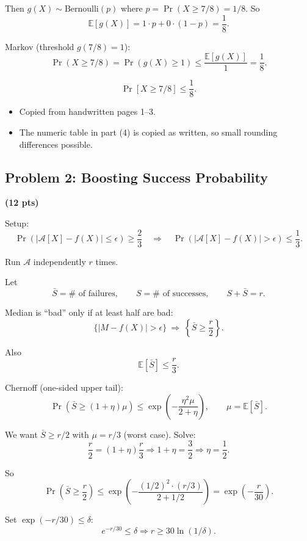 \documentclass[10pt]{article}
\newcommand{\spara}[1]{\vspace{.5em}\noindent {\large\sffamily\textcolor{nyuOfficialPurple}{#1}}}
\newcommand{\E}{\mathbb{E}}
\begin{document}
\begin{enumerate}[label=\arabic*.]
Then $g(X)\sim \text{Bernoulli}(p)$ where $p=\Pr(X\ge 7/8)=1/8$.
So
\[
\E[g(X)] = 1\cdot p + 0\cdot (1-p) = \frac{1}{8}.
\]

Markov (threshold $g(7/8)=1$):
\[
\Pr(X\ge 7/8)=\Pr(g(X)\ge 1)\le \frac{\E[g(X)]}{1}=\frac{1}{8}.
\]

\[
\boxed{\Pr[X\ge 7/8]\le \frac{1}{8}.}
\]

\spara{Notes for Problem 1}
\begin{itemize}
\item Copied from handwritten pages 1--3.
\item The numeric table in part (4) is copied as written, so small rounding differences possible.
\end{itemize}

\end{enumerate}



\subsection{Problem 2: Boosting Success Probability}
\textbf{(12 pts)}

\spara{Pr. 2}

Setup:
\[
\Pr(|\mathcal{A}[X]-f(X)|\le \epsilon)\ge \frac{2}{3}
\quad\Rightarrow\quad
\Pr(|\mathcal{A}[X]-f(X)|>\epsilon)\le \frac{1}{3}.
\]

Run $\mathcal{A}$ independently $r$ times.

Let
\[
\bar{S}=\#\text{ of failures},\qquad S=\#\text{ of successes},\qquad S+\bar{S}=r.
\]

Median is ``bad'' only if at least half are bad:
\[
\{|M-f(X)|>\epsilon\}\ \Rightarrow\ \left\{\bar{S}\ge \frac{r}{2}\right\}.
\]

Also
\[
\E[\bar{S}] \le \frac{r}{3}.
\]

Chernoff (one-sided upper tail):
\[
\Pr(\bar{S}\ge (1+\eta)\mu)\le \exp\!\left(-\frac{\eta^2\mu}{2+\eta}\right),
\qquad
\mu=\E[\bar{S}].
\]

We want $\bar{S}\ge r/2$ with $\mu=r/3$ (worst case). Solve:
\[
\frac{r}{2}=(1+\eta)\frac{r}{3}
\Rightarrow
1+\eta=\frac{3}{2}
\Rightarrow
\eta=\frac{1}{2}.
\]

So
\[
\Pr\!\left(\bar{S}\ge \frac{r}{2}\right)
\le
\exp\!\left(-\frac{(1/2)^2\cdot (r/3)}{2+1/2}\right)
=
\exp\!\left(-\frac{r}{30}\right).
\]

Set $\exp(-r/30)\le \delta$:
\[
e^{-r/30}\le \delta
\Rightarrow
r\ge 30\ln(1/\delta).
\]
\end{document}
